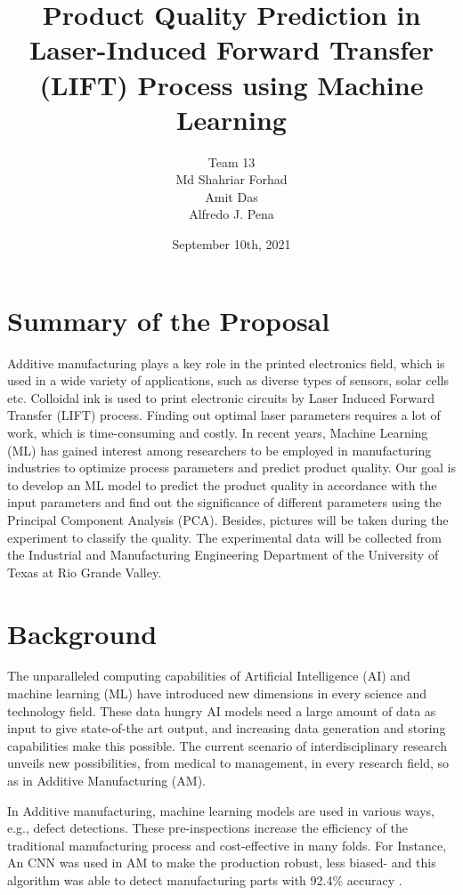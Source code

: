\documentclass[letterpaper]{article}
\title{Product Quality Prediction in Laser-Induced Forward Transfer (LIFT) Process using Machine Learning}
\author{Team 13 \\ Md Shahriar Forhad\\Amit Das\\Alfredo J. Pena}
\date{September 10th, 2021}
\begin{document}
\maketitle

\section*{Summary of the Proposal}
Additive manufacturing plays a key role in the printed electronics field, which is used in a wide variety of applications, such as diverse types of sensors, solar cells etc. Colloidal ink is used to print electronic circuits by Laser Induced Forward Transfer (LIFT) process. Finding out optimal laser parameters requires a lot of work, which is time-consuming and costly. In recent years, Machine Learning (ML) has gained interest among researchers to be employed in manufacturing industries to optimize process parameters and predict product quality. Our goal is to develop an ML model to predict the product quality in accordance with the input parameters and find out the significance of different parameters using the Principal Component Analysis (PCA). Besides, pictures will be taken during the experiment to classify the quality. The experimental data will be collected from the Industrial and Manufacturing Engineering Department of the University of Texas at Rio Grande Valley.

\section*{Background}
The unparalleled computing capabilities of Artificial Intelligence (AI) and machine learning (ML) have introduced new dimensions in every science and technology field. These data hungry AI models need a large amount of data as input to give state-of-the art output, and increasing data generation and storing capabilities make this possible. The current scenario of interdisciplinary research unveils new possibilities, from medical to management, in every research field, so as in Additive Manufacturing (AM).\par
In Additive manufacturing, machine learning models are used in various ways, e.g., defect detections. These pre-inspections increase the efficiency of the traditional manufacturing process and cost-effective in many folds. For Instance, An CNN was used in AM to make the production robust, less biased- and this algorithm was able to detect manufacturing parts with 92.4\% accuracy \parencite[]{cui}.
\end{document}

